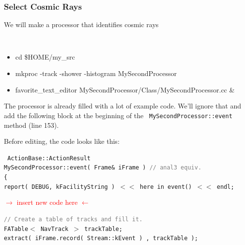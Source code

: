 \documentclass[12pt,compress]{beamer}
\begin{document}
\begin{frame}
\frametitle{Select Cosmic Rays}
We will make a processor that identifies cosmic rays

{\tt \scriptsize
\begin{itemize}
\item cd \$HOME/my\_src
\item mkproc -track -shower -histogram MySecondProcessor
\item favorite\_text\_editor MySecondProcessor/Class/MySecondProcessor.cc \&
\end{itemize}}

The processor is already filled with a lot of example code.  We'll
ignore that and add the following block at the beginning of the {\tt
MySecondProcessor::event} method (line 153).

Before editing, the code looks like this:
\vspace{0.5 cm}
\hspace{0.5 cm} \begin{minipage}{0.9\linewidth}
\tt \scriptsize
ActionBase::ActionResult \\
MySecondProcessor::event( Frame\& iFrame )          \textcolor{gray}{// anal3 equiv.} \\
\{ \\
\mbox{\hspace{0.25 cm}}report( DEBUG, kFacilityString ) $<<$ \rm \"\tt here in event()\rm \"\tt\ $<<$ endl;
\begin{center}
\textcolor{red}{$\rightarrow$ insert new code here $\leftarrow$}
\end{center}
\tt \mbox{\hspace{0.25 cm}}\textcolor{gray}{// Create a table of tracks and fill it.} \\
\mbox{\hspace{0.25 cm}}FATable$<$ NavTrack $>$ trackTable; \\
\mbox{\hspace{0.25 cm}}extract( iFrame.record( Stream::kEvent ) , trackTable );
\end{minipage}
\end{frame}
\end{document}
